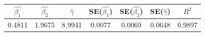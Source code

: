 \begin{tabular}{ccccccc}
\toprule
$\hat{\beta_1}$ & $\hat{\beta_2}$ & $\hat{\gamma}$ & SE($\hat{\beta_1}$) & SE($\hat{\beta_2}$) & SE($\hat{\gamma}$) & $R^2$ \\
\midrule
0.4811 & 1.9675 & 8.9941 & 0.0077 & 0.0069 & 0.0648 & 0.9897 \\
\bottomrule
\end{tabular}